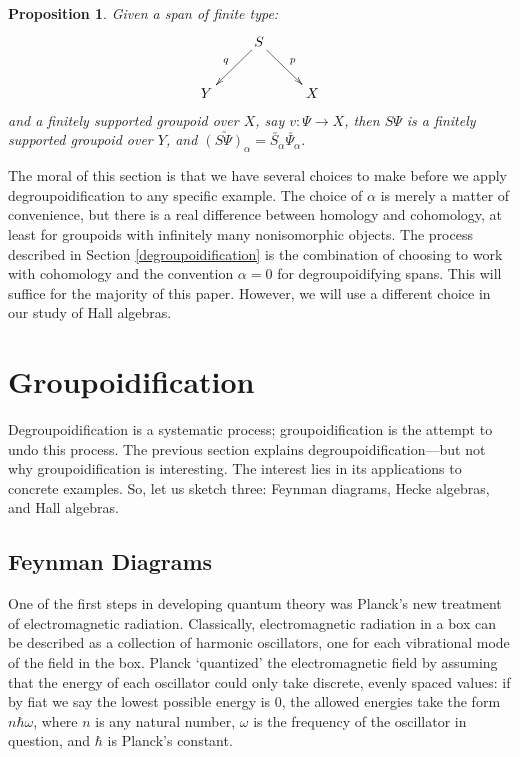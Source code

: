 \documentclass{article}
\renewcommand{\to}{\rightarrow}
\newcommand{\maps}{\colon}
\newtheorem{proposition}[thm]{Proposition}
\begin{document}
\begin{proposition} 
Given a span of finite type:
\[\xymatrix{
& S \ar[dl]_{q} \ar[dr]^{p}& \\
Y & & X
}\]
and a finitely supported groupoid over $X$, say $v\maps\Psi\to X$,
then $S\Psi$ is a finitely supported groupoid
over $Y$, and $\utilde{(S\Psi)_\alpha} = 
\utilde{S_\alpha}\utilde{\Psi_\alpha}$.
\end{proposition}

The moral of this section is that we have several choices to make
before we apply degroupoidification to any specific example.  The
choice of $\alpha$ is merely a matter of convenience, but there is a
real difference between homology and cohomology, at least for
groupoids with infinitely many nonisomorphic objects.  The process
described in Section \ref{degroupoidification} is the combination of
choosing to work with cohomology and the convention $\alpha=0$ for
degroupoidifying spans. This will suffice for the majority of this
paper.  However, we will use a different choice in our study of Hall
algebras.

\section{Groupoidification}
\label{applications}

Degroupoidification is a systematic process; groupoidification is the
attempt to undo this process.  The previous section explains
degroupoidification---but not why groupoidification is interesting.
The interest lies in its applications to concrete examples.  So, let
us sketch three: Feynman diagrams, Hecke algebras, and Hall algebras.

\subsection{Feynman Diagrams}
\label{feynman}

One of the first steps in developing quantum theory was Planck's new
treatment of electromagnetic radiation.  Classically, electromagnetic
radiation in a box can be described as a collection of harmonic
oscillators, one for each vibrational mode of the field in the box.
Planck `quantized' the electromagnetic field by assuming that the energy
of each oscillator could only take discrete, evenly spaced values: if
by fiat we say the lowest possible energy is $0$, the allowed energies
take the form $n \hbar \omega$, where $n$ is any natural number,
$\omega$ is the frequency of the oscillator in question, and $\hbar$
is Planck's constant.
\end{document}
